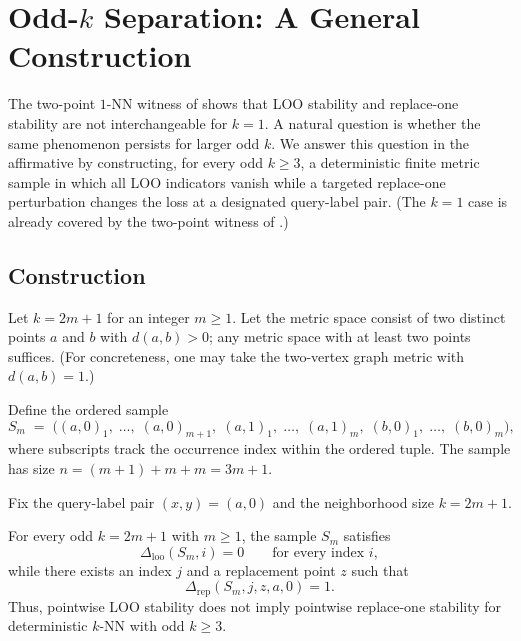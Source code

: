 \section{Odd-$k$ Separation: A General Construction}
\label{sec:odd-k-separation}

The two-point $1$-NN witness of  shows that LOO
stability and replace-one stability are not interchangeable for $k=1$. A natural
question is whether the same phenomenon persists for larger odd $k$. We answer
this question in the affirmative by constructing, for every odd $k \ge 3$, a
deterministic finite metric sample in which all LOO indicators vanish while a
targeted replace-one perturbation changes the loss at a designated query-label
pair.  (The $k=1$ case is already covered by the two-point witness of
.)

\subsection{Construction}

Let $k = 2m+1$ for an integer $m \ge 1$. Let the metric space consist of two
distinct points $a$ and $b$ with $d(a,b) > 0$; any metric space with at least
two points suffices. (For concreteness, one may take the two-vertex graph
metric with $d(a,b)=1$.)

Define the ordered sample
\[
S_m \;=\; \big((a,0)_1,\; \ldots,\; (a,0)_{m+1},\;
          (a,1)_1,\; \ldots,\; (a,1)_{m},\;
          (b,0)_1,\; \ldots,\; (b,0)_{m}\big),
\]
where subscripts track the occurrence index within the ordered tuple.
The sample has size $n = (m+1) + m + m = 3m+1$.

Fix the query-label pair $(x,y) = (a,0)$ and the neighborhood size $k = 2m+1$.

\begin{theorem}
\label{thm:odd-k-separation}
For every odd $k = 2m+1$ with $m \ge 1$, the sample $S_m$ satisfies
\[
\Delta_{\mathrm{loo}}(S_m, i) = 0 \qquad \text{for every index } i,
\]
while there exists an index $j$ and a replacement point $z$ such that
\[
\Delta_{\mathrm{rep}}(S_m, j, z, a, 0) = 1.
\]
Thus, pointwise LOO stability does not imply pointwise replace-one stability
for deterministic $k$-NN with odd $k \ge 3$.
\end{theorem}

